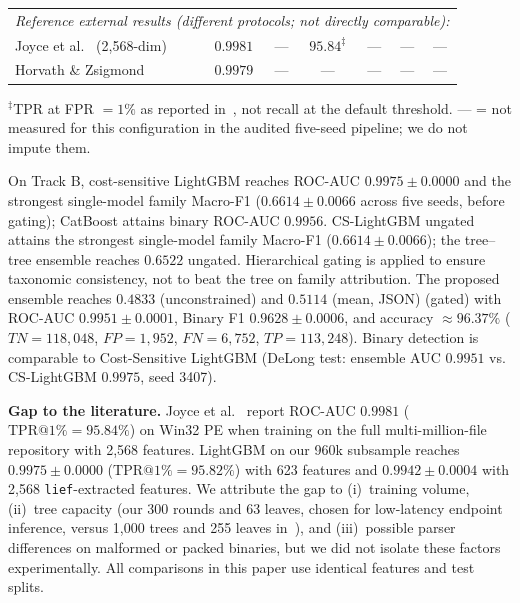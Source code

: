 \documentclass[Number]{sn-jnl}
\begin{document}
\begin{table}[htbp]
{\begin{tabular}{lcccccc}
\midrule
\multicolumn{7}{l}{\textit{Reference external results (different protocols; not directly comparable):}} \\
Joyce et al.~\cite{joyce2025ember2024} (2{,}568-dim) & $0.9981$           & ---              & $95.84^{\ddagger}$ & ---               & ---                  & ---                  \\
Horvath \& Zsigmond~\cite{horvath2026comparative}     & $0.9979$           & ---              & ---              & ---                 & ---                  & ---                  \\
\bottomrule
\end{tabular}}
\par\vspace{2pt}\raggedright\scriptsize
$^{\ddagger}$TPR at FPR $=1\%$ as reported in~\cite{joyce2025ember2024}, not recall at the default threshold.
--- = not measured for this configuration in the audited five-seed pipeline; we do not impute them.
\end{table}

\noindent On Track B, cost-sensitive LightGBM reaches ROC-AUC $0.9975\pm0.0000$ and the strongest single-model family Macro-F1 ($0.6614\pm0.0066$ across five seeds, before gating); CatBoost attains binary ROC-AUC $0.9956$. CS-LightGBM ungated attains the strongest single-model family Macro-F1 ($0.6614\pm0.0066$); the tree--tree ensemble reaches $0.6522$ ungated. Hierarchical gating is applied to ensure taxonomic consistency, not to beat the tree on family attribution. The proposed ensemble reaches $0.4833$ (unconstrained) and $0.5114$ (mean, JSON) (gated) with ROC-AUC $0.9951\pm0.0001$, Binary F1 $0.9628\pm0.0006$, and accuracy $\approx96.37\%$ ($TN=118{,}048$, $FP=1{,}952$, $FN=6{,}752$, $TP=113{,}248$). Binary detection is comparable to Cost-Sensitive LightGBM (DeLong test: ensemble AUC $0.9951$ vs. CS-LightGBM $0.9975$, seed 3407).

\noindent\textbf{Gap to the literature.}
Joyce et al.~\cite{joyce2025ember2024} report ROC-AUC $0.9981$ ($\text{TPR@1\%}=95.84\%$) on Win32 PE when training on the full multi-million-file repository with 2{,}568 features. LightGBM on our 960k subsample reaches $0.9975\pm0.0000$ ($\text{TPR@1\%}=95.82\%$) with 623 features and $0.9942\pm0.0004$ with 2{,}568 \texttt{lief}-extracted features. We attribute the gap to (i)~training volume, (ii)~tree capacity (our 300 rounds and 63 leaves, chosen for low-latency endpoint inference, versus 1{,}000 trees and 255 leaves in~\cite{joyce2025ember2024}), and (iii)~possible parser differences on malformed or packed binaries, but we did not isolate these factors experimentally. All comparisons in this paper use identical features and test splits.
\end{document}
